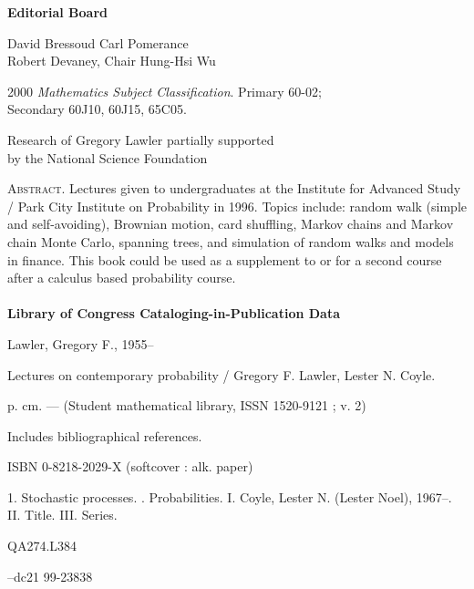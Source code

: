 \begin{copyrightpage}
\begin{center}
\textbf{Editorial Board}
\end{center}

\begin{center}
David Bressoud \hfill Carl Pomerance\\
Robert Devaney, Chair \hfill Hung-Hsi Wu
\end{center}

\begin{center}
2000 \emph{Mathematics Subject Classification}. Primary 60-02;\\
Secondary 60J10, 60J15, 65C05.
\end{center}

\begin{center}
Research of Gregory Lawler partially supported\\
by the National Science Foundation
\end{center}

\noindent \textsc{Abstract.} Lectures given to undergraduates at the Institute for Advanced Study / Park City Institute on Probability in 1996. Topics include: random walk (simple and self-avoiding), Brownian motion, card shuffling, Markov chains and Markov chain Monte Carlo, spanning trees, and simulation of random walks and models in finance. This book could be used as a supplement to or for a second course after a calculus based probability course.\\

\hrulefill\\

\noindent \textbf{Library of Congress Cataloging-in-Publication
Data}

\noindent Lawler, Gregory F., 1955--

Lectures on contemporary probability / Gregory F. Lawler, Lester N.
Coyle.

\quad p. cm. --- (Student mathematical library, ISSN 1520-9121 ; v.
2)

Includes bibliographical references.

ISBN 0-8218-2029-X (softcover : alk. paper)

1. Stochastic processes. . Probabilities. \quad I. Coyle,
Lester N. (Lester Noel), 1967--. \quad II. Title. \quad III. Series.

\noindent QA274.L384 

--dc21 \hfill 99-23838


\end{copyrightpage}
